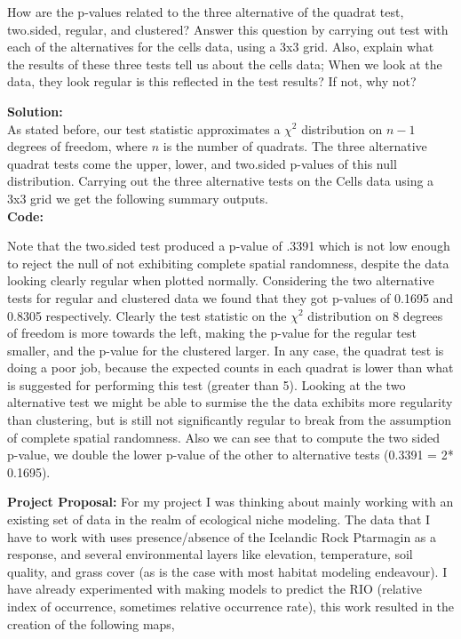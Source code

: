 \documentclass[12pt]{article}
\makeatletter
\theoremstyle{homework}
\newenvironment{exercise}[1]
{\def\@currentlabel{#1}\exercisecore}
{\endexercisecore}
\newcommand{\localhead}[1]{\par\smallskip\noindent\textbf{#1}\nobreak\\}%
\newcommand\solution{\localhead{Solution:}}
\makeatother
\begin{document}
\begin{exercise}{5} How are the p-values related to the three alternative of the quadrat test, two.sided, regular, and clustered? Answer this question by carrying out test with each of the alternatives 
  for the cells data, using a 3x3 grid. Also, explain what the results of these three tests tell us about the cells data; When we look at  the data, they look regular is this reflected in the test results?
  If not, why not?\\
  \solution As stated before, our test statistic approximates a $\chi^2$ distribution on $n - 1$ degrees of freedom, where $n$ is the number of quadrats. The three alternative quadrat tests come the upper, lower, and two.sided p-values of this 
  null distribution. Carrying out the three alternative tests on the Cells data using a 3x3 grid we get the following summary outputs. \\ 
  \textbf{Code:}
  \begin{center}
  
  \end{center}
  Note that the two.sided test produced a p-value of .3391 which is not low enough to reject the null of not exhibiting complete spatial randomness, despite the data looking clearly regular when plotted normally. 
  Considering the two alternative tests for regular and clustered data we found that they got p-values of 0.1695 and 0.8305 respectively. Clearly the test statistic on the $\chi^2$ distribution on 8 degrees of freedom 
  is more towards the left, making the p-value for the regular test smaller, and the p-value for the clustered larger. In any case, the quadrat test is doing a poor job, because the expected counts in each quadrat is lower than 
  what is suggested for performing this test (greater than 5). Looking at the two alternative test we might be able to surmise the the data exhibits more regularity than clustering, but is still not significantly regular to  break from the 
  assumption of complete spatial randomness. Also we can see that to compute the two sided p-value, we double the lower p-value of the other to alternative tests (0.3391 = 2* 0.1695).  

\end{exercise}
\newpage




\textbf{Project Proposal:} For my project I was thinking about mainly working with an existing set of data in the realm of ecological niche modeling. The data that I have to work with uses presence/absence of the Icelandic Rock Ptarmagin as a response, and several 
environmental layers like elevation, temperature, soil quality, and grass cover (as is the case with most habitat modeling endeavour). I have already experimented with making models to predict the RIO (relative index of occurrence, sometimes relative occurrence rate), this work resulted in the creation of the following maps,
\end{document}
